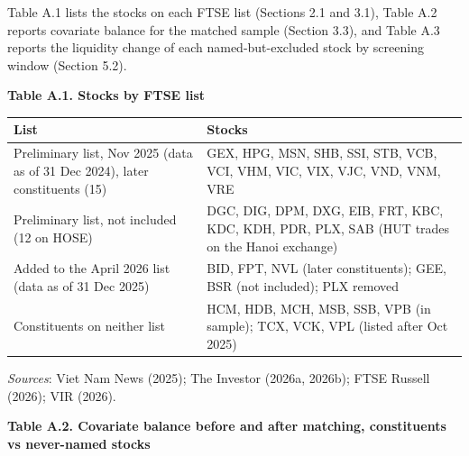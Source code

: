\documentclass[review,authoryear,12pt]{elsarticle}
\begin{document}
Table A.1 lists the stocks on each FTSE list (Sections 2.1 and 3.1),
Table A.2 reports covariate balance for the matched sample (Section
3.3), and Table A.3 reports the liquidity change of each
named-but-excluded stock by screening window (Section 5.2).

\textbf{Table A.1. Stocks by FTSE list}

\begin{longtable}[]{@{}>{\raggedright\arraybackslash}p{}>{\raggedright\arraybackslash}p{}@{}}
\toprule\noalign{}
\begin{minipage}[b]{\linewidth}\raggedright
List
\end{minipage} & \begin{minipage}[b]{\linewidth}\raggedright
Stocks
\end{minipage} \\
\midrule\noalign{}
\endhead
\bottomrule\noalign{}
\endlastfoot
Preliminary list, Nov 2025 (data as of 31 Dec 2024), later constituents
(15) & GEX, HPG, MSN, SHB, SSI, STB, VCB, VCI, VHM, VIC, VIX, VJC, VND,
VNM, VRE \\
Preliminary list, not included (12 on HOSE) & DGC, DIG, DPM, DXG, EIB,
FRT, KBC, KDC, KDH, PDR, PLX, SAB (HUT trades on the Hanoi exchange) \\
Added to the April 2026 list (data as of 31 Dec 2025) & BID, FPT, NVL
(later constituents); GEE, BSR (not included); PLX removed \\
Constituents on neither list & HCM, HDB, MCH, MSB, SSB, VPB (in sample);
TCX, VCK, VPL (listed after Oct 2025) \\
\end{longtable}

\emph{Sources}: Viet Nam News (2025); The Investor (2026a, 2026b); FTSE
Russell (2026); VIR (2026).

\textbf{Table A.2. Covariate balance before and after matching,
constituents vs never-named stocks}
\end{document}
